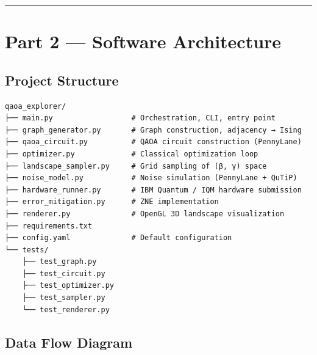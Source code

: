 \documentclass[
  11pt,
]{report}
\begin{document}
\begin{center}\rule{0.5\linewidth}{0.5pt}\end{center}

\section{Part 2 --- Software
Architecture}\label{part-2-software-architecture}

\subsection{Project Structure}\label{project-structure}

\begin{verbatim}
qaoa_explorer/
├── main.py                  # Orchestration, CLI, entry point
├── graph_generator.py       # Graph construction, adjacency → Ising
├── qaoa_circuit.py          # QAOA circuit construction (PennyLane)
├── optimizer.py             # Classical optimization loop
├── landscape_sampler.py     # Grid sampling of (β, γ) space
├── noise_model.py           # Noise simulation (PennyLane + QuTiP)
├── hardware_runner.py       # IBM Quantum / IQM hardware submission
├── error_mitigation.py      # ZNE implementation
├── renderer.py              # OpenGL 3D landscape visualization
├── requirements.txt
├── config.yaml              # Default configuration
└── tests/
    ├── test_graph.py
    ├── test_circuit.py
    ├── test_optimizer.py
    ├── test_sampler.py
    └── test_renderer.py
\end{verbatim}

\subsection{Data Flow Diagram}\label{data-flow-diagram}
\end{document}
